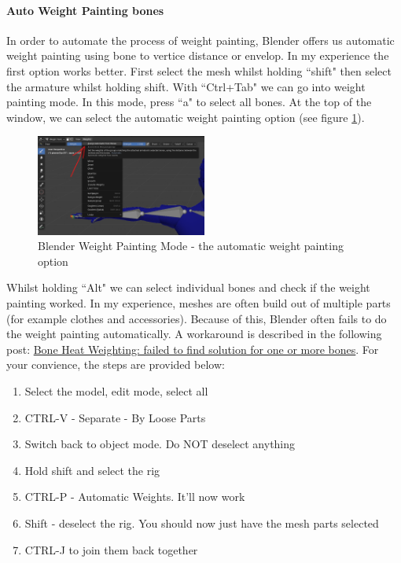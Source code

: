 \documentclass{uva-inf-article}
\begin{document}
\paragraph{Auto Weight Painting bones}
In order to automate the process of weight painting, Blender offers us automatic weight painting using bone to vertice distance or envelop. In my experience the first option works better. First select the mesh whilst holding ``shift" then select the armature whilst holding shift. With ``Ctrl+Tab" we can go into weight painting mode. In this mode, press ``a" to select all bones. At the top of the window, we can select the automatic weight painting option (see figure \ref{fig:autoweight}).
\begin{figure}[hbt!]
    \centering
    \includegraphics[width=0.5\textwidth]{imgs/autoweightpaint.png}
    \caption{Blender Weight Painting Mode - the automatic weight painting option}
    \label{fig:autoweight}
\end{figure}
Whilst holding ``Alt" we can select individual bones and check if the weight painting worked. In my experience, meshes are often build out of multiple parts (for example clothes and accessories). Because of this, Blender often fails to do the weight painting automatically. A workaround is described in the following post: \href{https://www.reddit.com/r/blenderhelp/comments/hpn4w5/comment/fxuh9l1/?utm_source=share&utm_medium=web3x&utm_name=web3xcss&utm_term=1&utm_content=share_button}{Bone Heat Weighting: failed to find solution for one or more bones}. For your convience, the steps are provided below:
\begin{enumerate}
    \item Select the model, edit mode, select all
    \item CTRL-V - Separate - By Loose Parts
    \item Switch back to object mode. Do NOT deselect anything
    \item Hold shift and select the rig
    \item CTRL-P - Automatic Weights. It'll now work
    \item Shift - deselect the rig. You should now just have the mesh parts selected
    \item CTRL-J to join them back together
\end{enumerate}
\end{document}
